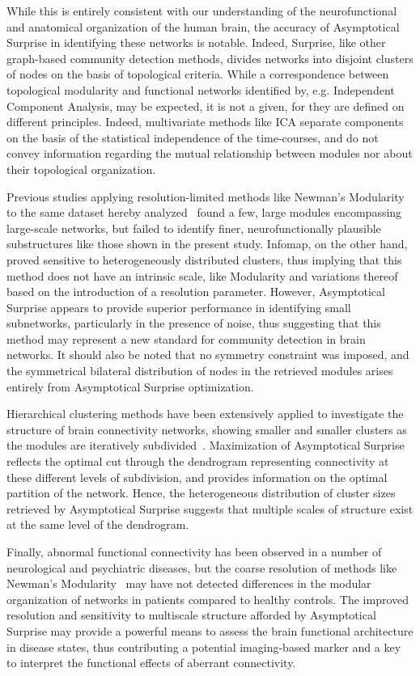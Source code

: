 While this is entirely consistent with our understanding of the neurofunctional and anatomical organization of the human brain, the accuracy of Asymptotical Surprise in identifying these networks is notable.
Indeed, Surprise, like other graph-based community detection methods, divides networks into disjoint clusters of nodes on the basis of topological criteria.
While a correspondence between topological modularity and functional networks identified by, e.g. Independent Component Analysis, may be expected, it is not a given, for they are defined on different principles. Indeed, multivariate methods like ICA separate components on the basis of the statistical independence of the time-courses, and do not convey information regarding the mutual relationship between modules nor about their topological organization.

Previous studies applying resolution-limited methods like Newman's Modularity to the same dataset hereby analyzed~\cite{crossley2013a} found a few, large modules encompassing large-scale networks, but failed to identify finer, neurofunctionally plausible substructures like those shown in the present study. Infomap, on the other hand, proved sensitive to heterogeneously distributed clusters, thus implying that this method does not have an intrinsic scale, like Modularity and variations thereof based on the introduction of a resolution parameter. 
However, Asymptotical Surprise appears to provide superior performance in identifying small subnetworks, particularly in the presence of noise, thus suggesting that this method may represent a new standard for community detection in brain networks. It should also be noted that no symmetry constraint was imposed, and the symmetrical bilateral distribution of nodes in the retrieved modules arises entirely from Asymptotical Surprise optimization. 

Hierarchical clustering methods have been extensively applied to investigate the structure of brain connectivity networks, showing smaller and smaller clusters as the modules are iteratively subdivided~\cite{meunier2010}. Maximization of Asymptotical Surprise reflects the optimal cut through the dendrogram representing connectivity at these different levels of subdivision, and provides information on the optimal partition of the network. Hence, the heterogeneous distribution of cluster sizes retrieved by Asymptotical Surprise suggests that multiple scales of structure exist at the same level of the dendrogram.

Finally, abnormal functional connectivity has been observed in a number of neurological and psychiatric diseases, but the coarse resolution of methods like Newman's Modularity~\cite{fornito2015} may have not detected differences in the modular organization of networks in patients compared to healthy controls. The improved resolution and sensitivity to multiscale structure afforded by Asymptotical Surprise may provide a powerful means to assess the brain functional architecture in disease states, thus contributing a potential imaging-based marker and a key to interpret the functional effects of aberrant connectivity.
